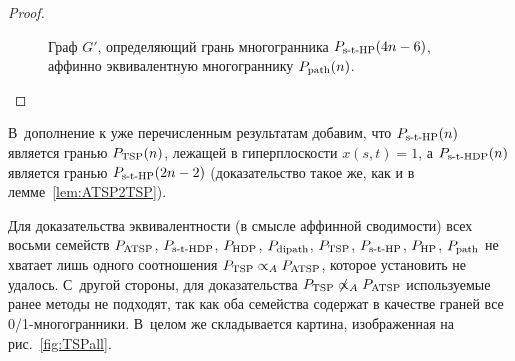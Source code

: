 \begin{proof}
\begin{figure}[tbh]
	\caption{Граф $G'$, определяющий грань многогранника $P_{\textup{s-t-HP}}(4n-6)$, аффинно эквивалентную многограннику $P_{\textup{path}}(n)$.}
	\label{fig:Path}
\end{figure}
\end{proof}

В~дополнение к уже перечисленным результатам добавим, что $P_{\textup{s-t-HP}}(n)$ является гранью $P_{\textup{TSP}}(n)$, лежащей в гиперплоскости $x(s,t) = 1$,
а $P_{\textup{s-t-HDP}}(n)$ является гранью $P_{\textup{s-t-HP}}(2n-2)$ (доказательство такое же, как и в лемме~\ref{lem:ATSP2TSP}).


Для доказательства эквивалентности (в смысле аффинной сводимости) всех восьми семейств $P_{\textup{ATSP}}$, $P_{\textup{s-t-HDP}}$, $P_{\textup{HDP}}$, $P_{\textup{dipath}}$, $P_{\textup{TSP}}$, $P_{\textup{s-t-HP}}$, $P_{\textup{HP}}$, $P_{\textup{path}}$ не хватает лишь одного соотношения $P_{\textup{TSP}} \propto_A P_{\textup{ATSP}}$, которое установить не удалось. 
С~другой стороны, для доказательства $\TSP \npropto_A \ATSP$ используемые ранее методы не подходят, так как оба семейства содержат в качестве граней все 0/1-многогранники.
В~целом же складывается картина, изображенная на рис.~\ref{fig:TSPall}.

